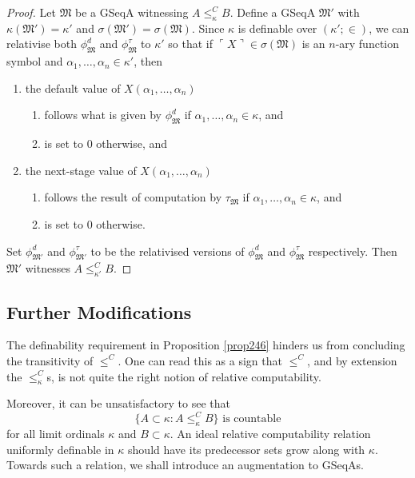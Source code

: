 \documentclass[12pt]{article}
\numberwithin{equation}{section}
\begin{document}
\begin{proof}
Let $\mathfrak{M}$ be a GSeqA witnessing $A \leq^C_{\kappa} B$. Define a GSeqA $\mathfrak{M}'$ with $\kappa(\mathfrak{M}') = \kappa'$ and $\sigma(\mathfrak{M}') = \sigma(\mathfrak{M})$. Since $\kappa$ is definable over $(\kappa'; \in)$, we can relativise both $\phi^d_{\mathfrak{M}}$ and $\phi^{\tau}_{\mathfrak{M}}$ to $\kappa'$ so that if $\ulcorner X \urcorner \in \sigma(\mathfrak{M})$ is an $n$-ary function symbol and $\alpha_1, \dots, \alpha_n \in \kappa'$, then 
\begin{enumerate}[label=(\arabic*)]
    \item the default value of $X(\alpha_1, \dots, \alpha_n)$
    \begin{enumerate}[label=(\alph*)]
        \item follows what is given by $\phi^d_{\mathfrak{M}}$ if $\alpha_1, \dots, \alpha_n \in \kappa$, and
        \item is set to $0$ otherwise, and
    \end{enumerate}
    \item the next-stage value of $X(\alpha_1, \dots, \alpha_n)$
    \begin{enumerate}[label=(\alph*)]
        \item follows the result of computation by $\tau_{\mathfrak{M}}$ if $\alpha_1, \dots, \alpha_n \in \kappa$, and
        \item is set to $0$ otherwise.
    \end{enumerate}
\end{enumerate} 
Set $\phi^d_{\mathfrak{M}'}$ and $\phi^{\tau}_{\mathfrak{M}'}$ to be the relativised versions of $\phi^d_{\mathfrak{M}}$ and $\phi^{\tau}_{\mathfrak{M}}$ respectively. Then $\mathfrak{M}'$ witnesses $A \leq^C_{\kappa'} B$.
\end{proof}

\subsection{Further Modifications}

The definability requirement in Proposition \ref{prop246} hinders us from concluding the transitivity of $\leq^C$. One can read this as a sign that $\leq^C$, and by extension the $\leq^C_{\kappa}$s, is not quite the right notion of relative computability.

Moreover, it can be unsatisfactory to see that
\begin{equation*}
    \{A \subset \kappa : A \leq^C_{\kappa} B\} \text{ is countable}
\end{equation*}
for all limit ordinals $\kappa$ and $B \subset \kappa$. An ideal relative computability relation uniformly definable in $\kappa$ should have its predecessor sets grow along with $\kappa$. Towards such a relation, we shall introduce an augmentation to GSeqAs.
\end{document}
